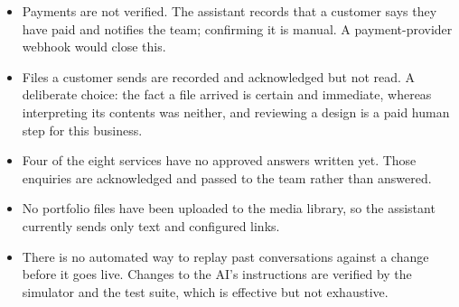 \documentclass[10pt,a4paper]{article}
\begin{document}
\begin{itemize}
\item Payments are not verified. The assistant records that a customer says
they have paid and notifies the team; confirming it is manual. A
payment-provider webhook would close this.
\item Files a customer sends are recorded and acknowledged but not read. A
deliberate choice: the fact a file arrived is certain and immediate, whereas
interpreting its contents was neither, and reviewing a design is a paid human
step for this business.
\item Four of the eight services have no approved answers written yet. Those
enquiries are acknowledged and passed to the team rather than answered.
\item No portfolio files have been uploaded to the media library, so the
assistant currently sends only text and configured links.
\item There is no automated way to replay past conversations against a change
before it goes live. Changes to the AI's instructions are verified by the
simulator and the test suite, which is effective but not exhaustive.
\end{itemize}
\end{document}

